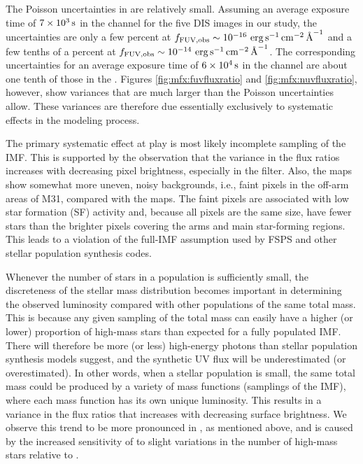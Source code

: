 The Poisson uncertainties in \fxobs{} are relatively small. Assuming an average
exposure time of $7\times 10^3\,\mathrm{s}$ in the \fuv{} channel for the five DIS
images in our study, the uncertainties are only a few percent at $f_{\mathrm{FUV},\mathrm{obs}} \sim
10^{-16}\, \,\mathrm{erg}\,\mathrm{s}^{-1}\,\mathrm{cm}^{-2}\,\textrm{\AA}^{-1}$ and a few tenths of a percent at $f_{\mathrm{FUV},\mathrm{obs}} \sim
10^{-14}\, \,\mathrm{erg}\,\mathrm{s}^{-1}\,\mathrm{cm}^{-2}\,\textrm{\AA}^{-1}$. The corresponding \nuv{} uncertainties for an average
exposure time of $6\times 10^4\,\mathrm{s}$ in the \nuv{} channel are about one tenth
of those in the \fuv{}. Figures \ref{fig:mfx:fuvfluxratio} and
\ref{fig:mfx:nuvfluxratio}, however, show variances that are much larger than
the Poisson uncertainties allow. These variances are therefore due essentially
exclusively to systematic effects in the modeling process.

The primary systematic effect at play is most likely incomplete sampling of the
IMF. This is supported by the observation that the variance in the flux ratios
increases with decreasing pixel brightness, especially in the \fuv{} filter.
Also, the \fxsfh{} maps show somewhat more uneven, noisy backgrounds, i.e.,
faint pixels in the off-arm areas of M31, compared with the \fxobs{} maps. The
faint pixels are associated with low star formation (SF) activity and, because
all pixels are the same size, have fewer stars than the brighter pixels
covering the arms and main star-forming regions. This leads to a violation of
the full-IMF assumption used by FSPS and other stellar population synthesis
codes.

Whenever the number of stars in a population is sufficiently small, the
discreteness of the stellar mass distribution becomes important in determining
the observed luminosity compared with other populations of the same total mass.
This is because any given sampling of the total mass can easily have a higher
(or lower) proportion of high-mass stars than expected for a fully populated
IMF. There will therefore be more (or less) high-energy photons than stellar
population synthesis models suggest, and the synthetic UV flux will be
underestimated (or overestimated). In other words, when a stellar population is
small, the same total mass could be produced by a variety of mass functions
(samplings of the IMF), where each mass function has its own unique luminosity.
This results in a variance in the flux ratios that increases with decreasing
surface brightness. We observe this trend to be more pronounced in \fuv{}, as
mentioned above, and is caused by the increased sensitivity of \ffuvobs{} to
slight variations in the number of high-mass stars relative to \fnuvobs{}.

